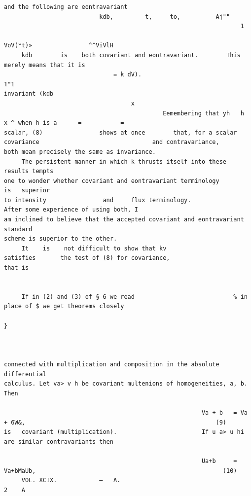 \documentclass[10pt]{article}
\begin{document}
\begin{verbatim}
and the following are eontravariant
                           kdb,         t,     to,          Aj""
                                                                   1
                                                                       VoV(*t)»                ^^ViVlH
     kdb        is    both covariant and eontravariant.        This merely means that it is
                               = k dV).                                  1"1
invariant (kdb
                                    x
                                             Eemembering that yh   h    x ^ when h is a      =           =
scalar, (8)                shows at once        that, for a scalar covariance                                and contravariance,
both mean precisely the same as invariance.
     The persistent manner in which k thrusts itself into these results tempts
one to wonder whether covariant and eontravariant terminology                                                           is   superior
to intensity                and     flux terminology.                  After some experience of using both, I
am inclined to believe that the accepted covariant and eontravariant standard
scheme is superior to the other.
     It    is    not difficult to show that kv                              satisfies       the test of (8) for covariance,
that is


     If in (2) and (3) of § 6 we read                            % in place of $ we get theorems closely
                                                                                                 }



connected with multiplication and composition in the absolute differential
calculus. Let va> v h be covariant multenions of homogeneities, a, b. Then

                                                        Va + b   = Va + 6W&,                                                      (9)
is   covariant (multiplication).                        If u a> u hi are similar contravariants then

                                                        Ua+b     = Va+bMaUb,                                                     (10)
     VOL. XCIX.            —   A.                                                                                       2    A


\end{verbatim}
\clearpage
\end{document}
